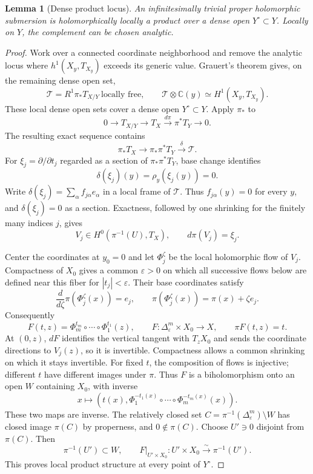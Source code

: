 \documentclass[11pt,reqno]{amsart}
\numberwithin{equation}{section}
\newtheorem{lemma}[theorem]{Lemma}
\theoremstyle{definition}
\theoremstyle{remark}
\begin{document}
\begin{lemma}[Dense product locus]\label{lem:dense-product}
An infinitesimally trivial proper holomorphic submersion is
holomorphically locally a product over a dense open $Y^\circ\subset Y$.
Locally on $Y$, the complement can be chosen analytic.
\end{lemma}
\begin{proof}
Work over a connected coordinate neighborhood and remove the analytic
locus where $h^1(X_y,T_{X_y})$ exceeds its generic value.  Grauert's
theorem gives, on the remaining dense open set,
\[
 \mathcal T=R^1\pi_*T_{X/Y}\ \text{locally free},\qquad
 \mathcal T\otimes\mathbb C(y)\simeq H^1(X_y,T_{X_y}).
\]
These local dense open sets cover a dense open $Y^\circ\subset Y$.
Apply $\pi_*$ to
\[
 0\longrightarrow T_{X/Y}\longrightarrow T_X
   \xrightarrow{d\pi}\pi^*T_Y\longrightarrow0.
\]
The resulting exact sequence contains
\[
 \pi_*T_X\longrightarrow\pi_*\pi^*T_Y
       \xrightarrow{\delta}\mathcal T.
\]
For $\xi_j=\partial/\partial t_j$ regarded as a section of
$\pi_*\pi^*T_Y$, base change identifies
\[
 \delta(\xi_j)(y)=\rho_y(\xi_j(y))=0.
\]
Write $\delta(\xi_j)=\sum_\alpha f_{j\alpha}e_\alpha$ in a local
frame of $\mathcal T$.  Thus $f_{j\alpha}(y)=0$ for every $y$, and
$\delta(\xi_j)=0$ as a section.  Exactness, followed by one shrinking
for the finitely many indices $j$, gives
\[
 V_j\in H^0(\pi^{-1}(U),T_X),\qquad d\pi(V_j)=\xi_j.
\]

Center the coordinates at $y_0=0$ and let $\Phi_j^\zeta$ be the
local holomorphic flow of $V_j$.  Compactness of $X_0$ gives a
common $\varepsilon>0$ on which all successive flows below are
defined near this fiber for $|t_j|<\varepsilon$.  Their base
coordinates satisfy
\[
 \frac{d}{d\zeta}\pi(\Phi_j^\zeta(x))=e_j,
 \qquad \pi(\Phi_j^\zeta(x))=\pi(x)+\zeta e_j.
\]
Consequently
\[
 F(t,z)=\Phi_m^{t_m}\circ\cdots\circ\Phi_1^{t_1}(z),
 \qquad F:\Delta_\varepsilon^m\times X_0\longrightarrow X,
 \qquad \pi F(t,z)=t.
\]
At $(0,z)$, $dF$ identifies the vertical tangent with $T_zX_0$
and sends the coordinate directions to $V_j(z)$, so it is invertible.
Compactness allows a common shrinking on which it stays invertible.
For fixed $t$, the composition of flows is injective; different $t$
have different images under $\pi$.  Thus $F$ is a biholomorphism
onto an open $W$ containing $X_0$, with inverse
\[
 x\longmapsto\left(t(x),
   \Phi_1^{-t_1(x)}\circ\cdots\circ\Phi_m^{-t_m(x)}(x)\right).
\]
These two maps are inverse.  The relatively closed set
$C=\pi^{-1}(\Delta_\varepsilon^m)\setminus W$ has closed image
$\pi(C)$ by properness, and $0\notin\pi(C)$.
Choose $U'\ni0$ disjoint from $\pi(C)$.  Then
\[
 \pi^{-1}(U')\subset W,\qquad
 F|_{U'\times X_0}:U'\times X_0\xrightarrow{\sim}\pi^{-1}(U').
\]
This proves local product structure at every point of $Y^\circ$.
\end{proof}
\end{document}
